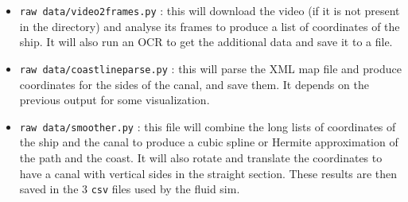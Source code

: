 \documentclass[a4paper]{article}
\begin{document}
\begin{itemize}
	\item \texttt{raw data/video2frames.py} : this will download the video (if it is not present in the directory) and analyse its frames to produce a list of coordinates of the ship. It will also run an OCR to get the additional data and save it to a file.
	\item \texttt{raw data/coastlineparse.py} : this will parse the XML map file and produce coordinates for the sides of the canal, and save them. It depends on the previous output for some visualization.
	\item \texttt{raw data/smoother.py} : this file will combine the long lists of coordinates of the ship and the canal to produce a cubic spline or Hermite approximation of the path and the coast. It will also rotate and translate the coordinates to have a canal with vertical sides in the straight section. These results are then saved in the 3 \texttt{csv} files used by the fluid sim.
\end{itemize} 
\end{document}
